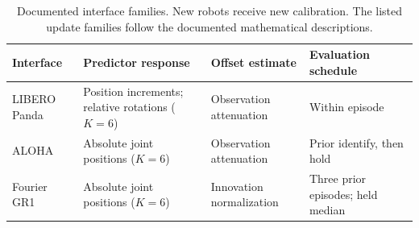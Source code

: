 \begin{table}[H]
\centering\small
\caption{Documented interface families. New robots receive new calibration.
The listed update families follow the documented mathematical descriptions.}
\label{tab:implementation}
\setlength{\tabcolsep}{4pt}
\begin{tabular}{@{}>{\raggedright\arraybackslash}p{.16\linewidth}>{\raggedright\arraybackslash}p{.30\linewidth}>{\raggedright\arraybackslash}p{.23\linewidth}>{\raggedright\arraybackslash}p{.22\linewidth}@{}}
\toprule
Interface & Predictor response & Offset estimate & Evaluation schedule\\
\midrule
LIBERO Panda & Position increments; relative rotations ($K=6$) & Observation attenuation & Within episode\\
ALOHA & Absolute joint positions ($K=6$) & Observation attenuation & Prior identify, then hold\\
Fourier GR1 & Absolute joint positions ($K=6$) & Innovation normalization & Three prior episodes; held median\\
\bottomrule
\end{tabular}
\end{table}

